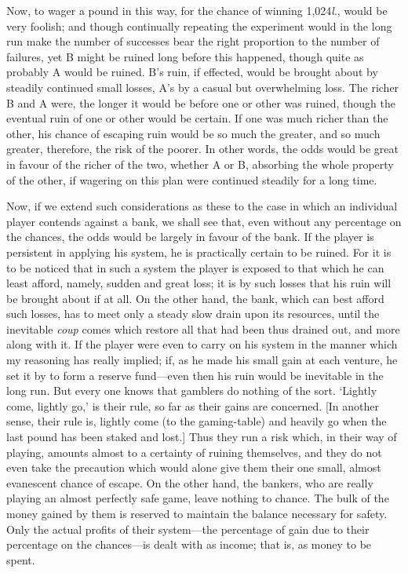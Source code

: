 \documentclass[letterpaper,12pt,oneside,openany]{memoir}
\begin{document}
Now, to wager a pound in this way, for the chance
of winning 1,024\textit{l}., would be very foolish; and though
continually repeating the experiment would in the long
run make the number of successes bear the right proportion
to the number of failures, yet B might be
ruined long before this happened, though quite as probably
A would be ruined. B's ruin, if effected, would
be brought about by steadily continued small losses, A's
by a casual but overwhelming loss. The richer B and
A were, the longer it would be before one or other was
ruined, though the eventual ruin of one or other would
be certain. If one was much richer than the other, his
chance of escaping ruin would be so much the greater,
and so much greater, therefore, the risk of the poorer.
In other words, the odds would be great in favour of the
richer of the two, whether A or B, absorbing the whole
property of the other, if wagering on this plan were
continued steadily for a long time.

Now, if we extend such considerations as these to
the case in which an individual player contends against
a bank, we shall see that, even without any percentage
on the chances, the odds would be largely in favour of
the bank. If the player is persistent in applying his
system, he is practically certain to be ruined. For it is
to be noticed that in such a system the player is exposed
to that which he can least afford, namely, sudden and
great loss; it is by such losses that his ruin will be
brought about if at all. On the other hand, the bank,
which can best afford such losses, has to meet only
a steady slow drain upon its resources, until the inevitable
\emph{coup} comes which restore all that had been thus
drained out, and more along with it. If the player
were even to carry on his system in the manner which
my reasoning has really implied; if, as he made his
small gain at each venture, he set it by to form a reserve
fund---even then his ruin would be inevitable in the
long run. But every one knows that gamblers do
nothing of the sort. `Lightly come, lightly go,' is their
rule, so far as their gains are concerned. [In another
sense, their rule is, lightly come (to the gaming-table)
and heavily go when the last pound has been staked and
lost.] Thus they run a risk which, in their way of
playing, amounts almost to a certainty of ruining themselves,
and they do not even take the precaution which
would alone give them their one small, almost evanescent
chance of escape. On the other hand, the bankers,
who are really playing an almost perfectly safe game,
leave nothing to chance. The bulk of the money gained
by them is reserved to maintain the balance necessary
for safety. Only the actual profits of their system---the
percentage of gain due to their percentage on the chances---is
dealt with as income; that is, as money to be spent.
\end{document}
